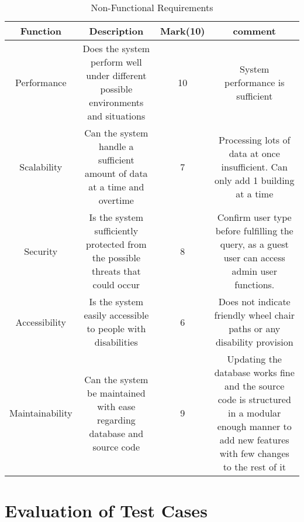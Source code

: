 \documentclass[12pt]{article}
\begin{document}
\begin{table}[h!]	
	\settowidth{\longline}{This function returns a}
	\centering
	\caption{Non-Functional Requirements}
	\label{tab:table2}
	\begin{tabular}{|c|c|c|c|}
		
		\hline
		\hline
		Function  & Description & Mark(10)  & comment\\
		\hline
		\hline
		
		Performance  & \parbox[t]{\longline}{Does the system perform well under different possible environments and situations} & 10 & \parbox[t]{\longline}{System performance is sufficient}\\
		
		\hline
		Scalability & \parbox[t]{\longline}{Can the system handle a sufficient amount of data at a time and overtime} &  7 & \parbox[t]{\longline}{Processing lots of data at once insufficient. Can only add 1 building at a time}\\
		\hline
		Security & \parbox[t]{\longline}{Is the system sufficiently protected from the possible threats that could occur} & 8 & \parbox[t]{\longline}{Confirm user type before fulfilling the query, as a guest user can access admin user functions.}\\
		\hline
		Accessibility & \parbox[t]{\longline}{Is the system easily accessible to people with disabilities} & 6 & \parbox[t]{\longline}{Does not indicate friendly wheel chair paths or any disability provision}\\
		\hline
		Maintainability & \parbox[t]{\longline}{Can the system be maintained with ease regarding database and source code} &  9 & \parbox[t]{\longline}{Updating the database works fine and the source code is structured in a modular enough manner to add new features with few changes to the rest of it}\\
		\hline
	\end{tabular}
	
\end{table}

\section{Evaluation of Test Cases}
\end{document}
